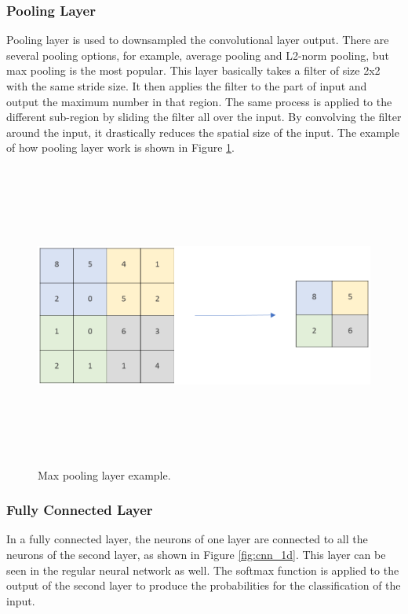 \subsubsection{Pooling Layer}
Pooling layer is used to downsampled the convolutional layer output. There are several pooling options, for example, average pooling and L2-norm pooling, but max pooling is the most popular. This layer basically takes a filter of size 2x2 with the same stride size. It then applies the filter to the part of input and output the maximum number in that region. The same process is applied to the different sub-region by sliding the filter all over the input. By convolving the filter around the input, it drastically reduces the spatial size of the input. The example of how pooling layer work is shown in Figure \ref{fig:maxpool}.

\begin{figure}[htpb]
	\centering
	\includegraphics[width=12cm,height=10cm,keepaspectratio=true]{images/maxpool}
	\caption{
		Max pooling layer example.
	}
	\label{fig:maxpool}
\end{figure}

\subsubsection{Fully Connected Layer}
In a fully connected layer, the neurons of one layer are connected to all the neurons of the second layer, as shown in Figure \ref{fig:cnn_1d}. This layer can be seen in the regular neural network as well. The softmax function is applied to the output of the second layer to produce the probabilities for the classification of the input. 

